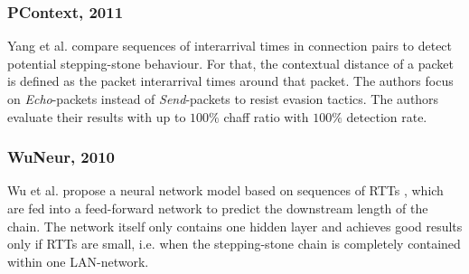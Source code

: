 \documentclass[runningheads,11pt]{llncs}\usepackage[]{graphicx}\usepackage[]{color}
\begin{document}




\subsubsection{PContext, 2011}

Yang et al. \cite{yang2011correlating} compare sequences of interarrival times in connection pairs to detect potential stepping-stone behaviour. For that, the contextual distance of a packet is defined as the packet interarrival times around that packet. %
The authors focus on \textit{Echo}-packets instead of \textit{Send}-packets to resist evasion tactics.%
The authors evaluate their results with up to $100\%$ chaff ratio with $100\%$ detection rate.

\vspace{-0.6cm}





\subsubsection{WuNeur, 2010}

Wu et al. \cite{wu2010neural} propose a neural network model based on sequences of RTTs%
, which are fed into a feed-forward network to predict the downstream length of the chain. The network itself only contains one hidden layer and achieves good results only if RTTs are small, i.e. when the stepping-stone chain is completely contained within one LAN-network.
\end{document}
